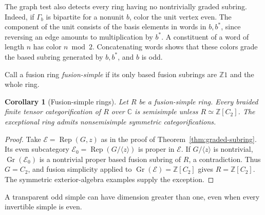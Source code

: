 \documentclass[11pt,reqno]{amsart}
\newtheorem{corollary}[theorem]{Corollary}
\theoremstyle{definition}
\newcommand{\CC}{\mathbb C}
\newcommand{\ZZ}{\mathbb Z}
\newcommand{\Rep}{\operatorname{Rep}}
\DeclareMathOperator{\Gr}{Gr}
\begin{document}
The graph test also detects every ring having no nontrivially graded subring. Indeed, if $\Gamma_b$ is bipartite for a nonunit $b$, color the unit vertex even. The component of the unit consists of the basis elements in words in $b,b^*$, since reversing an edge amounts to multiplication by $b^*$. A constituent of a word of length $n$ has color $n\bmod 2$. Concatenating words shows that these colors grade the based subring generated by $b,b^*$, and $b$ is odd.

Call a fusion ring \emph{fusion-simple} if its only based fusion subrings are $\ZZ1$ and the whole ring.

\begin{corollary}[Fusion-simple rings]\label{thm:fusion-simple}
Let $R$ be a fusion-simple ring. Every braided finite tensor categorification of $R$ over $\CC$ is semisimple unless $R\simeq\ZZ[C_2]$. The exceptional ring admits nonsemisimple symmetric categorifications.
\end{corollary}
\begin{proof}
Take $\mathcal E=\Rep(G,z)$ as in the proof of Theorem~\ref{thm:graded-subring}. Its even subcategory $\mathcal E_0=\Rep(G/\langle z\rangle)$ is proper in $\mathcal E$. If $G/\langle z\rangle$ is nontrivial, $\Gr(\mathcal E_0)$ is a nontrivial proper based fusion subring of $R$, a contradiction. Thus $G=C_2$, and fusion simplicity applied to $\Gr(\mathcal E)=\ZZ[C_2]$ gives $R=\ZZ[C_2]$. The symmetric exterior-algebra examples supply the exception.
\end{proof}

A transparent odd simple can have dimension greater than one, even when every invertible simple is even.
\end{document}
